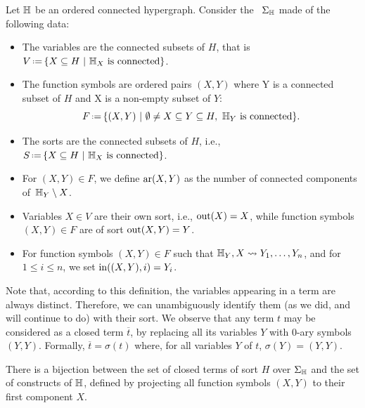 \begin{definition} \label{def:signature-hyper}
  Let ${\mathbb H}$ be an ordered connected hypergraph. 
Consider the ~$\Sigma_{\mathbb H}$ made of the following data: 
\begin{itemize}
  \item The variables are the connected subsets of $H$, that is $V\eqdef \{ X \subseteq H \ | \ \hyper{H}_{X} \text{ is connected}\}$. 
  \item The function symbols are ordered pairs $(X,Y)$ where Y is a connected subset of $H$ and  X is a non-empty subset of $Y$:
  $$F\eqdef \{(X,Y) \ | \ \emptyset \neq X \subseteq Y \subseteq H, \ \hyper{H}_Y \text{ is connected}\}.$$
  \item The sorts are the connected subsets of $H$, i.e., $S\eqdef \{ X \subseteq H \ | \ \hyper{H}_X \text{ is connected}\}$.
  \item For $(X,Y) \in F$, we define $\mathrm{ar}(X,Y)$ as the number of connected components of~${\mathbb H}_Y\setminus X$.
  \item Variables $X \in V$ are their own sort, i.e., $\mathrm{out}(X)=X$, while function symbols $(X,Y) \in F$ are of sort $\mathrm{out}(X,Y)=Y$.
  \item For function symbols $(X,Y) \in F$ such that ${\mathbb H}_Y,X \leadsto Y_1,\ldots,Y_n$, and for $1 \leq i \leq n$, we set $\mathrm{in}((X,Y),i)=Y_i$.
\end{itemize}
\end{definition}

\begin{remark} \label{open-to-closed}
  Note that, according to this definition, the variables appearing in a term are always distinct. 
  Therefore, we can unambiguously identify them (as we did, and will continue to do) with their  sort.
We 
observe that any term $t$ may be considered as a closed term $\overline{t}$, by replacing all its variables $Y$ with $0$-ary symbols $(Y,Y)$. Formally, $\overline{t}=\sigma(t)$ where, for all variables $Y$ of $t$, $\sigma(Y)=(Y,Y)$.
\end{remark}

\begin{lemma} 
  \label{l:bijection-terms}
  There is a bijection between the set of closed terms of sort $H$ over $\Sigma_{\mathbb H}$ and the set of constructs of ${\mathbb H}$, defined by projecting all function symbols $(X,Y)$ to their first component $X$.
\end{lemma}

